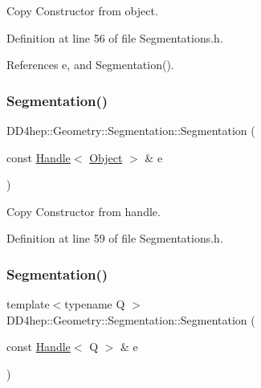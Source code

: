 Copy Constructor from object. 



Definition at line 56 of file Segmentations.\+h.



References e, and Segmentation().

\hypertarget{class_d_d4hep_1_1_geometry_1_1_segmentation_a52de777daf55b13d94eae2eb8f794b89}{}\label{class_d_d4hep_1_1_geometry_1_1_segmentation_a52de777daf55b13d94eae2eb8f794b89} 
\subsubsection{\texorpdfstring{Segmentation()}{Segmentation()}\hspace{0.1cm}{\footnotesize\ttfamily [4/5]}}
{\footnotesize\ttfamily D\+D4hep\+::\+Geometry\+::\+Segmentation\+::\+Segmentation (\begin{DoxyParamCaption}\item[{const \hyperlink{class_d_d4hep_1_1_handle}{Handle}$<$ \hyperlink{class_d_d4hep_1_1_geometry_1_1_segmentation_a91154cc3b58985ac86388d00572ee48f}{Object} $>$ \&}]{e }\end{DoxyParamCaption})\hspace{0.3cm}{\ttfamily [inline]}}



Copy Constructor from handle. 



Definition at line 59 of file Segmentations.\+h.

\hypertarget{class_d_d4hep_1_1_geometry_1_1_segmentation_a03114abcb0002cc53096277890cd1e6e}{}\label{class_d_d4hep_1_1_geometry_1_1_segmentation_a03114abcb0002cc53096277890cd1e6e} 
\subsubsection{\texorpdfstring{Segmentation()}{Segmentation()}\hspace{0.1cm}{\footnotesize\ttfamily [5/5]}}
{\footnotesize\ttfamily template$<$typename Q $>$ \\
D\+D4hep\+::\+Geometry\+::\+Segmentation\+::\+Segmentation (\begin{DoxyParamCaption}\item[{const \hyperlink{class_d_d4hep_1_1_handle}{Handle}$<$ Q $>$ \&}]{e }\end{DoxyParamCaption})\hspace{0.3cm}{\ttfamily [inline]}}



